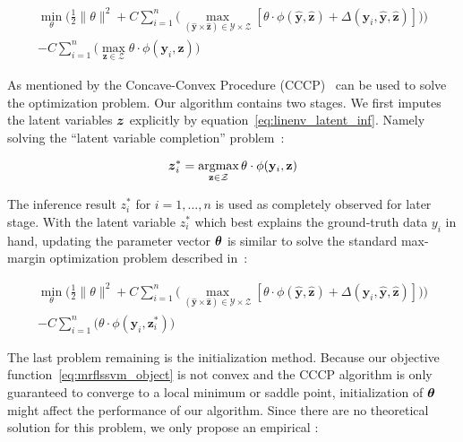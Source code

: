 \documentclass[sigconf, anonymous, review]{acmart}
\renewcommand{\citename}{\citet}
\renewcommand{\cite}{\citep}
\begin{document}
\begin{align}
\label{eq:lssvm_object}
  \min_\theta\bigg(\frac{1}{2}\|\theta\|^2+
  C\sum_{i=1}^{n}\big(\max_{(\mathbf{\hat{y}} \times
  \mathbf{\hat{z}}) \in \mathcal{Y} \times \mathcal{Z}}
  [\theta\cdot\phi(\mathbf{\hat{y}},\mathbf{\hat{z}}) +
  \Delta(\mathbf{y}_i,\mathbf{\hat{y}},\mathbf{\hat{z}})]\big)\bigg)\\
  -C\sum_{i=1}^{n}\big(\max_{\mathbf{z} \in \mathcal{Z}} \theta \cdot
  \phi(\mathbf{y}_i,\mathbf{z})\big)\nonumber
\end{align}

As mentioned by \citename{yu2009learning} the Concave-Convex
Procedure (CCCP)~\cite{yuille2002concave} can be used to solve the
optimization problem. Our algorithm contains two stages. We first
imputes the latent variables ${\boldsymbol{z}}$ explicitly by
equation~\eqref{eq:linenv_latent_inf}. Namely solving the
``latent variable completion'' problem~\cite{yu2009learning}:

\begin{align}
  {\boldsymbol{z}}_i^*=\mathop{\textrm{argmax}}_{\mathbf{z} \in \mathcal{Z}} \theta \cdot
  \phi(\mathbf{y}_i,\mathbf{z})
\end{align}

The inference result $z_i^*$ for $i=1,\dots,n$ is used as
completely observed for later stage. With the latent variable
$z_i^*$ which best explains the ground-truth data $y_i$ in hand,
updating the parameter vector $\boldsymbol{\theta}$ is similar to solve the
standard max-margin optimization problem described
in~\cite{gouldlearning}:

\begin{align}
\label{eq:mrflssvm_object}
  \min_\theta\bigg(\frac{1}{2}\|\theta\|^2+
  C\sum_{i=1}^{n}\big(\max_{(\mathbf{\hat{y}} \times
  \mathbf{\hat{z}}) \in \mathcal{Y} \times \mathcal{Z}}
  [\theta\cdot\phi(\mathbf{\hat{y}},\mathbf{\hat{z}}) +
  \Delta(\mathbf{y}_i,\mathbf{\hat{y}},\mathbf{\hat{z}})]\big)\bigg)\\
  -C\sum_{i=1}^{n}\big(\theta \cdot
  \phi(\mathbf{y}_i,\mathbf{z}_i^*)\big) \nonumber
\end{align}

The last problem remaining is the initialization method. Because
our objective function~\eqref{eq:mrflssvm_object} is not convex
and the CCCP algorithm is only guaranteed to converge to a local
minimum or saddle point\cite{yuille2002concave}, initialization
of $\boldsymbol{\theta}$ might affect the performance of our algorithm. Since
there are no theoretical solution for this problem, we only
propose an empirical :
\end{document}
